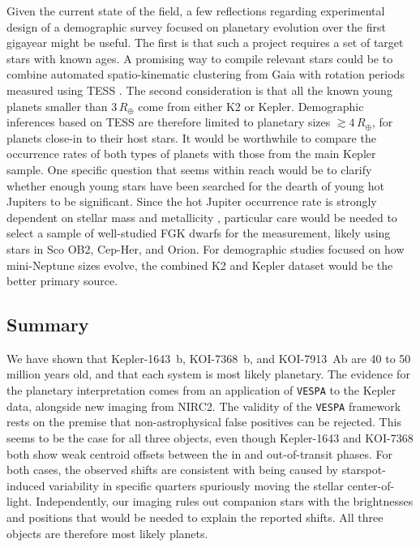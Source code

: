 \documentclass[12pt,twocolumn,tighten,linenumbers,trackchanges]{aastex63}
\begin{document}
Given the current state of the field, a few reflections regarding
experimental design of a demographic survey focused on planetary
evolution over the first gigayear might be useful.  The first is that
such a project requires a set of target stars with known ages.  A
promising way to compile relevant stars could be to combine automated
spatio-kinematic clustering from Gaia with rotation periods measured
using TESS \citep[see the appendices of][]{bouma_kep1627_2022}.  The
second consideration is that all the known young planets smaller than
$3$\,$R_\oplus$ come from either K2 or Kepler.  Demographic inferences
based on TESS are therefore limited to planetary sizes
$\gtrsim4$\,$R_\oplus$, for planets close-in to their host stars.  It
would be worthwhile to compare the occurrence rates of both types of
planets with those from the main Kepler sample.  One specific question
that seems within reach would be to clarify whether enough young stars
have been searched for the dearth of young hot Jupiters to be
significant.  Since the hot Jupiter occurrence rate is strongly
dependent on stellar mass and metallicity
\citep{petigura_metallicity_2018,petigura_cksX_2022}, particular care
would be needed to select a sample of well-studied FGK dwarfs for the
measurement, likely using stars in Sco OB2, Cep-Her, and Orion.  For
demographic studies focused on how mini-Neptune sizes evolve, the
combined K2 and Kepler dataset would be the better primary source.  



\subsection{Summary}

We have shown that Kepler-1643~b, KOI-7368~b, and KOI-7913~Ab are 40
to 50 million years old, and that each system is most likely
planetary.  The evidence for the planetary interpretation comes from
an application of \texttt{VESPA} to the Kepler data, alongside new
imaging from NIRC2.  The validity of the \texttt{VESPA} framework
rests on the premise that non-astrophysical false positives can be
rejected.  
This seems to be the case for all three objects, even though
Kepler-1643 and KOI-7368 
both show weak centroid offsets between the in
and out-of-transit phases.  For both cases, the observed shifts
are consistent with being caused by starspot-induced variability in
specific quarters spuriously moving the stellar center-of-light.
Independently, our imaging rules out companion stars with the
brightnesses and positions that would be needed to explain the
reported shifts.  All three objects are therefore most likely planets.
\end{document}

